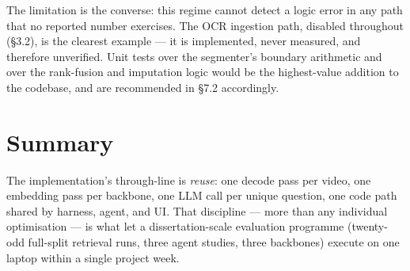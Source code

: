 The limitation is the converse: this regime cannot detect a logic error
in any path that no reported number exercises. The OCR ingestion path,
disabled throughout (§3.2), is the clearest example --- it is
implemented, never measured, and therefore unverified. Unit tests over
the segmenter's boundary arithmetic and over the rank-fusion and
imputation logic would be the highest-value addition to the codebase,
and are recommended in §7.2 accordingly.

\section{Summary}

The implementation's through-line is \emph{reuse}: one decode pass per
video, one embedding pass per backbone, one LLM call per unique
question, one code path shared by harness, agent, and UI. That
discipline --- more than any individual optimisation --- is what let a
dissertation-scale evaluation programme (twenty-odd full-split retrieval
runs, three agent studies, three backbones) execute on one laptop within
a single project week.
